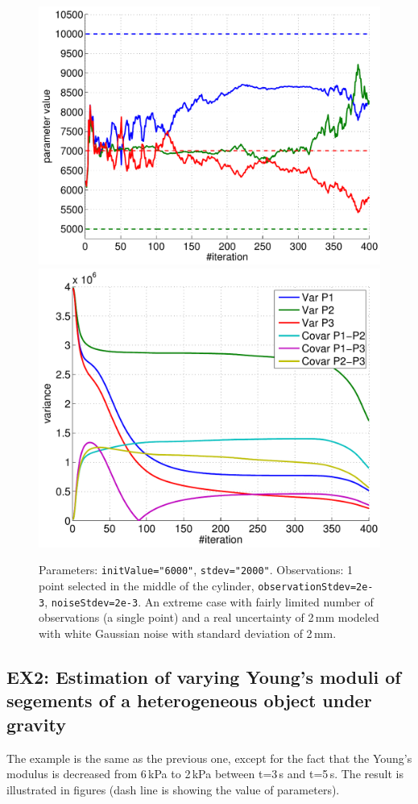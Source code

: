 \documentclass[10pt]{article}
\begin{document}
\begin{figure}[ht]
\begin{center}
\includegraphics[width=.49\linewidth]{figures/p6_estim.pdf}
\hfill
\includegraphics[width=.49\linewidth]{figures/p6_var.pdf}
\caption{Parameters: \texttt{initValue="6000"}, \texttt{stdev="2000"}. Observations: 1 point selected in the middle of the cylinder,
\texttt{observationStdev=2e-3}, \texttt{noiseStdev=2e-3}. An extreme case with fairly limited number of observations (a single point) and a real
uncertainty of 2\,mm modeled with white Gaussian noise with standard deviation of 2\,mm.}
\label{fig:Results6}
\end{center}
\end{figure}

\subsection{EX2: Estimation of varying Young's moduli of segements of a heterogeneous object under gravity}
The example is the same as the previous one, except for the fact that the Young's modulus is decreased from 6\,kPa to 2\,kPa between t=3\,s and t=5\,s.
The result is illustrated in figures (dash line is showing the value of parameters).
\end{document}
